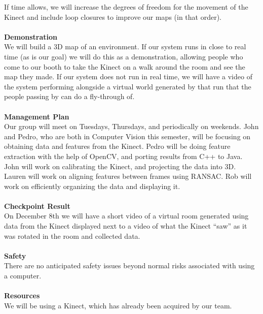 \documentclass[12pt]{article}
\begin{document}
If time allows, we will increase the degrees of freedom for the movement of the Kinect and include
loop closures to improve our maps (in that order).
\\ \\
{\bf Demonstration }\\
We will build a 3D map of an environment.  If our system runs in close to real time (as is our goal)
we will do this as a demonstration, allowing people who come to our booth to take the Kinect on a
walk around the room and see the map they made.  If our system does not run in real time, we will
have a video of the system performing alongside a virtual world generated by that run that the people
passing by can do a fly-through of.
\\ \\
{\bf Management Plan }\\
Our group will meet on Tuesdays, Thursdays, and periodically on weekends.  John and Pedro,
who are both in Computer Vision this semester, will be focusing on obtaining data and features
from the Kinect.  Pedro will be doing feature extraction with the help of OpenCV, and porting
results from C++ to Java.  John will work on calibrating the Kinect, and projecting the data into
3D.  Lauren will work on aligning features between frames using RANSAC.  Rob will work on efficiently
organizing the data and displaying it.
\\ \\
{\bf Checkpoint Result }\\
On December 8th we will have a short video of a virtual room generated using data from the Kinect
displayed next to a video of what the Kinect ``saw'' as it was rotated in the room and collected data.
\\ \\
{\bf Safety }\\
There are no anticipated safety issues beyond normal risks associated with using a computer.
\\ \\
{\bf Resources }\\
We will be using a Kinect, which has already been acquired by our team.
\end{document}
